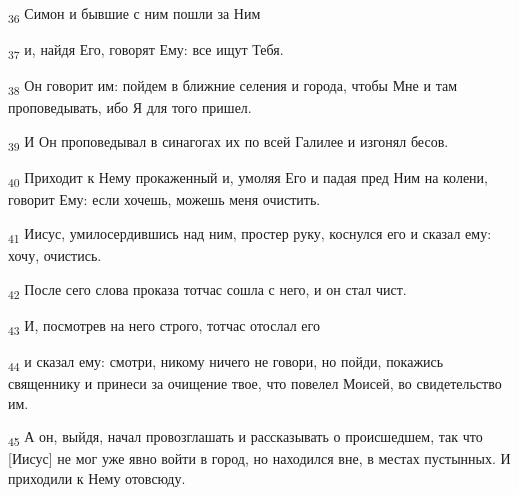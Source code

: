 \begin{tcolorbox}
\textsubscript{36} Симон и бывшие с ним пошли за Ним
\end{tcolorbox}
\begin{tcolorbox}
\textsubscript{37} и, найдя Его, говорят Ему: все ищут Тебя.
\end{tcolorbox}
\begin{tcolorbox}
\textsubscript{38} Он говорит им: пойдем в ближние селения и города, чтобы Мне и там проповедывать, ибо Я для того пришел.
\end{tcolorbox}
\begin{tcolorbox}
\textsubscript{39} И Он проповедывал в синагогах их по всей Галилее и изгонял бесов.
\end{tcolorbox}
\begin{tcolorbox}
\textsubscript{40} Приходит к Нему прокаженный и, умоляя Его и падая пред Ним на колени, говорит Ему: если хочешь, можешь меня очистить.
\end{tcolorbox}
\begin{tcolorbox}
\textsubscript{41} Иисус, умилосердившись над ним, простер руку, коснулся его и сказал ему: хочу, очистись.
\end{tcolorbox}
\begin{tcolorbox}
\textsubscript{42} После сего слова проказа тотчас сошла с него, и он стал чист.
\end{tcolorbox}
\begin{tcolorbox}
\textsubscript{43} И, посмотрев на него строго, тотчас отослал его
\end{tcolorbox}
\begin{tcolorbox}
\textsubscript{44} и сказал ему: смотри, никому ничего не говори, но пойди, покажись священнику и принеси за очищение твое, что повелел Моисей, во свидетельство им.
\end{tcolorbox}
\begin{tcolorbox}
\textsubscript{45} А он, выйдя, начал провозглашать и рассказывать о происшедшем, так что [Иисус] не мог уже явно войти в город, но находился вне, в местах пустынных. И приходили к Нему отовсюду.
\end{tcolorbox}
